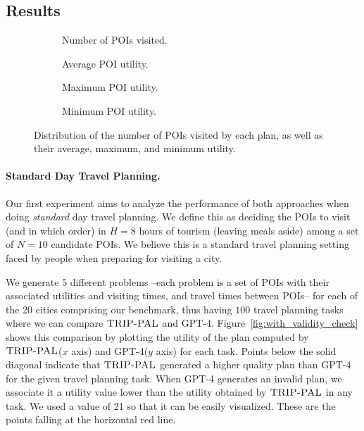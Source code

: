 \documentclass[letterpaper]{article}
\newcommand{\gpt}{{\sc GPT-4}\xspace}
\newcommand{\approach}{\ensuremath{\textsc{TRIP-PAL}}\xspace}
\begin{document}
\subsection{Results}


\begin{figure*}[thb]
    \begin{subfigure}{0.25\textwidth}
    \centering
    
    \caption{Number of POIs visited.}
    \label{fig:pois_number}
    \end{subfigure}\hfill
    \begin{subfigure}{0.25\textwidth}
    \centering
    
    \caption{Average POI utility.}
    \label{fig:avg_utility}
    \end{subfigure}\hfill
    \begin{subfigure}{0.25\textwidth}
    \centering
    
    \caption{Maximum POI utility.}
    \label{fig:max_utility}
    \end{subfigure}\hfill
    \begin{subfigure}{0.25\textwidth}
    \centering
    
    \caption{Minimum POI utility.}
    \label{fig:min_utility}
    \end{subfigure}\hfill
    \caption{Distribution of the number of POIs visited by each plan, as well as their average, maximum, and minimum utility.}
    \label{fig:all}
\end{figure*}

\paragraph{Standard Day Travel Planning.}
Our first experiment aims to analyze the performance of both approaches when doing \emph{standard} day travel planning.
We define this as deciding the POIs to visit (and in which order) in $H=8$ hours of tourism (leaving meals aside) among a set of $N=10$ candidate POIs.
We believe this is a standard travel planning setting faced by people when preparing for visiting a city.

We generate $5$ different problems --each problem is a set of POIs with their associated utilities and visiting times, and travel times between POIs-- for each of the $20$ cities comprising our  benchmark, thus having $100$ travel planning tasks where we can compare \approach and \gpt.
Figure~\ref{fig:with_validity_check} shows this comparison by plotting the utility of the plan computed by \approach ($x$ axis) and \gpt ($y$ axis) for each task.
Points below the solid diagonal indicate that \approach generated a higher quality plan than \gpt for the given travel planning task.
When \gpt generates an invalid plan, we associate it a utility value lower than the utility obtained by \approach in any task. We used a value of 21 so that it can be easily visualized.
These are the points falling at the horizontal red line.
\end{document}
